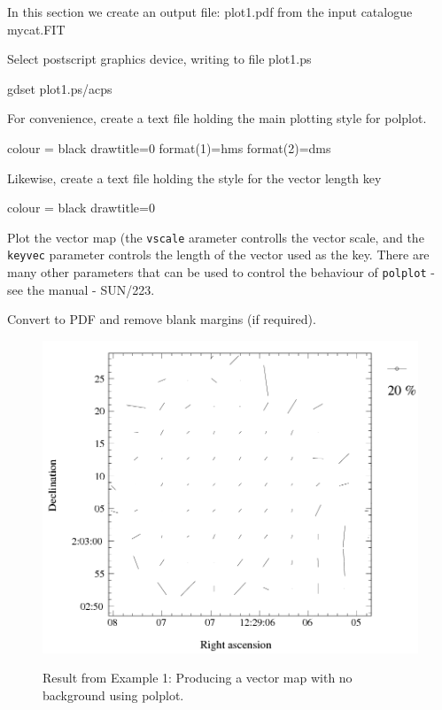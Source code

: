 In this section we create an output file: plot1.pdf from the input catalogue mycat.FIT

Select postscript graphics device, writing to file plot1.ps

\begin{terminalv}
gdset plot1.ps/acps
\end{terminalv}

For convenience, create a text file holding the main plotting style for polplot.

\begin{terminalv}
colour = black
drawtitle=0
format(1)=hms
format(2)=dms
\end{terminalv}

Likewise, create a text file holding the style for the vector length key

\begin{terminalv}
colour = black
drawtitle=0
\end{terminalv}


Plot the vector map (the \texttt{vscale} arameter controlls the vector
scale, and the \texttt{keyvec} parameter controls the length of the
vector used as the key. There are many other parameters that can be used
to control the behaviour of \texttt{polplot} - see the \polpack manual - SUN/223.

\begin{terminalv}
\end{terminalv}

Convert to PDF and remove blank margins (if required).

\begin{terminalv}
\end{terminalv}


\begin{figure}[t!]
\begin{center}
\includegraphics[width=0.75\linewidth]{sc22-kappa-plots-plot1.png}
\label{fig:kappa-plot1}
\caption [Vector map with polplot]{
  \small Result from Example 1: Producing a vector map with no background using polplot. 
}
\end{center}
\end{figure}

